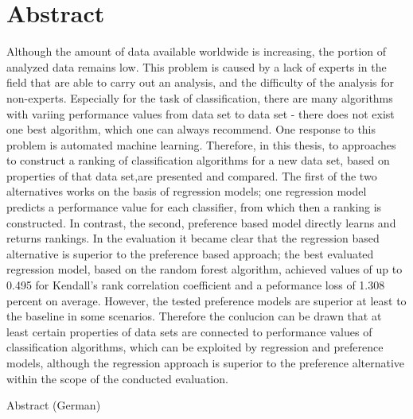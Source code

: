 %
\chapter*{Abstract}
\label{sec:abstract}
\vspace*{-10mm}

Although the amount of data available worldwide is increasing, the portion of analyzed data remains low. This problem is caused by a lack of experts in the field that are able to carry out an analysis, and the difficulty of the analysis for non-experts. Especially for the task of classification, there are many algorithms with variing performance values from data set to data set - there does not exist one best algorithm, which one can always recommend. One response to this problem is automated machine learning. Therefore, in this thesis, to approaches to construct a ranking of classification algorithms for a new data set, based on properties of that data set,are presented and compared. The first of the two alternatives works on the basis of regression models; one regression model predicts a performance value for each classifier, from which then a ranking is constructed. In contrast, the second, preference based model directly learns and returns rankings. In the evaluation it became clear that the regression based alternative is superior to the preference based approach; the best evaluated regression model, based on the random forest algorithm, achieved values of up to 0.495 for Kendall's rank correlation coefficient and a peformance loss of 1.308 percent on average. However, the tested preference models are superior at least to the baseline in some scenarios. Therefore the conlucion can be drawn that at least certain properties of data sets are connected to performance values of classification algorithms, which can be exploited by regression and preference models, although the regression approach is superior to the preference alternative within the scope of the conducted evaluation.

\vspace*{20mm}
\newpage

{Abstract (German)}\label{sec:abstract-german} \\

